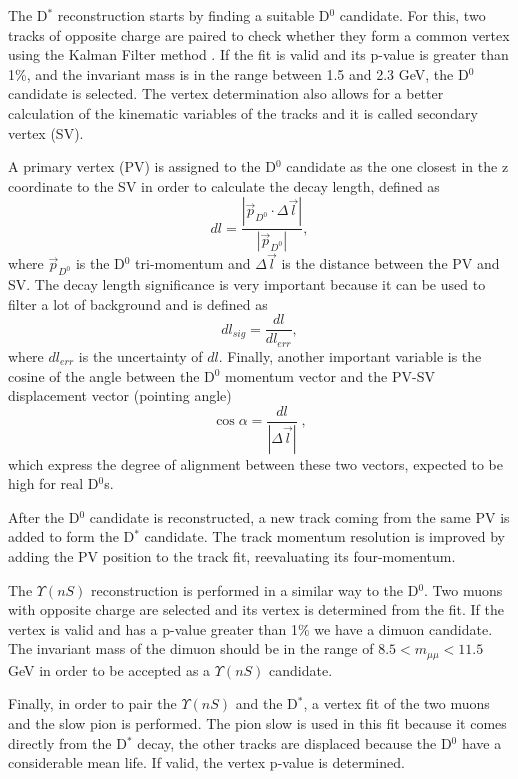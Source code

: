 The D$^*$ reconstruction starts by finding a suitable D$^0$ candidate. For this, two tracks of opposite charge are paired to check whether they form a common vertex using the Kalman Filter method \cite{Fruhwirth:1991pm, Speer:927395}. If the fit is valid and its p-value is greater than 1\%, and the invariant mass is in the range between 1.5 and 2.3 GeV, the D$^0$ candidate is selected. The vertex determination also allows for a better calculation of the kinematic variables of the tracks and it is called secondary vertex (SV).

A primary vertex (PV) is assigned to the D$^0$ candidate as the one closest in the z coordinate to the SV in order to calculate the decay length, defined as
\begin{equation}
  dl = \frac{|\Vec{p}_{D^0} \cdot \Delta\Vec{l}|}{|\Vec{p}_{D^0}|},
\end{equation}
where $\Vec{p}_{D^0}$ is the D$^0$ tri-momentum and $\Delta\Vec{l}$ is the distance between the PV and SV. The decay length significance is very important because it can be used to filter a lot of background and is defined as
\begin{equation}
  dl_{sig} = \frac{dl}{dl_{err}},
\end{equation}
where $dl_{err}$ is the uncertainty of $dl$. Finally, another important variable is the cosine of the angle between the D$^0$ momentum vector and the PV-SV displacement vector (pointing angle)
\begin{equation}
  \cos{\alpha} = \frac{dl}{|\Delta\Vec{l}|} \; ,
\end{equation}
which express the degree of alignment between these two vectors, expected to be high for real D$^0$s.

After the D$^0$ candidate is reconstructed, a new track coming from the same PV is added to form the D$^*$ candidate. The track momentum resolution is improved by adding the PV position to the track fit, reevaluating its four-momentum.
 
The $\Upsilon(nS)$ reconstruction is performed in a similar way to the D$^0$. Two muons with opposite charge are selected and its vertex is determined from the fit. If the vertex is valid and has a p-value greater than 1\% we have a dimuon candidate. The invariant mass of the dimuon should be in the range of $8.5 < m_{\mu\mu} < 11.5$ GeV in order to be accepted as a $\Upsilon(nS)$ candidate.

Finally, in order to pair the $\Upsilon(nS)$ and the D$^*$, a vertex fit of the two muons and the slow pion is performed. The pion slow is used in this fit because it comes directly from the D$^*$ decay, the other tracks are displaced because the D$^0$ have a considerable mean life. If valid, the vertex p-value is determined.

